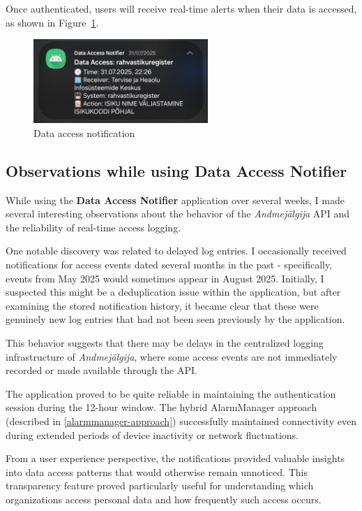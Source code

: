 Once authenticated, users will receive real-time alerts when their data is accessed, as shown in Figure~\ref{fig:data-access-notification}.

\begin{figure}[H]
\centering
\includegraphics[width=250px]{english/figures/Screenshot_20250801_133754_Signal.jpg}
\caption{Data access notification}
\label{fig:data-access-notification}
\end{figure}

\subsection{Observations while using \textbf{Data Access Notifier}}
\label{observations}

While using the \textbf{Data Access Notifier} application over several weeks, I made several interesting observations about the behavior of the \textit{Andmejälgija} API and the reliability of real-time access logging.

One notable discovery was related to delayed log entries. I occasionally received notifications for access events dated several months in the past - specifically, events from May 2025 would sometimes appear in August 2025. Initially, I suspected this might be a deduplication issue within the application, but after examining the stored notification history, it became clear that these were genuinely new log entries that had not been seen previously by the application.

This behavior suggests that there may be delays in the centralized logging infrastructure of \textit{Andmejälgija}, where some access events are not immediately recorded or made available through the API.

The application proved to be quite reliable in maintaining the authentication session during the 12-hour window. The hybrid AlarmManager approach (described in \ref{alarmmanager-approach}) successfully maintained connectivity even during extended periods of device inactivity or network fluctuations.

From a user experience perspective, the notifications provided valuable insights into data access patterns that would otherwise remain unnoticed. This transparency feature proved particularly useful for understanding which organizations access personal data and how frequently such access occurs.


